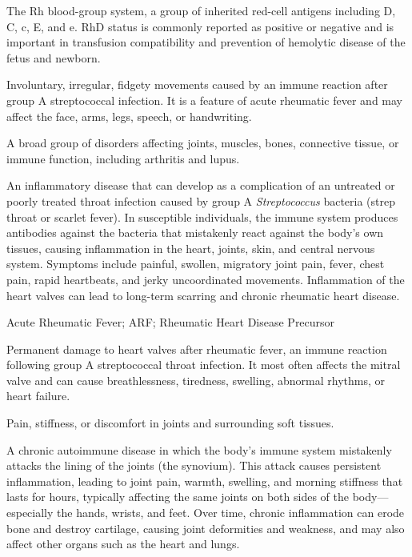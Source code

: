  The Rh blood-group system, a group of inherited red-cell antigens including D, C, c, E, and e. RhD status is commonly reported as positive or negative and is important in transfusion compatibility and prevention of hemolytic disease of the fetus and newborn.

 Involuntary, irregular, fidgety movements caused by an immune reaction after group A streptococcal infection. It is a feature of acute rheumatic fever and may affect the face, arms, legs, speech, or handwriting.

 A broad group of disorders affecting joints, muscles, bones, connective tissue, or immune function, including arthritis and lupus.

 An inflammatory disease that can develop as a complication of an untreated or poorly treated throat infection caused by group A \textit{Streptococcus} bacteria (strep throat or scarlet fever). In susceptible individuals, the immune system produces antibodies against the bacteria that mistakenly react against the body's own tissues, causing inflammation in the heart, joints, skin, and central nervous system. Symptoms include painful, swollen, migratory joint pain, fever, chest pain, rapid heartbeats, and jerky uncoordinated movements. Inflammation of the heart valves can lead to long-term scarring and chronic rheumatic heart disease.

\synonyms
Acute Rheumatic Fever; ARF; Rheumatic Heart Disease Precursor

 Permanent damage to heart valves after rheumatic fever, an immune reaction following group A streptococcal throat infection. It most often affects the mitral valve and can cause breathlessness, tiredness, swelling, abnormal rhythms, or heart failure.

 Pain, stiffness, or discomfort in joints and surrounding soft tissues.

 A chronic autoimmune disease in which the body's immune system mistakenly attacks the lining of the joints (the synovium). This attack causes persistent inflammation, leading to joint pain, warmth, swelling, and morning stiffness that lasts for hours, typically affecting the same joints on both sides of the body---especially the hands, wrists, and feet. Over time, chronic inflammation can erode bone and destroy cartilage, causing joint deformities and weakness, and may also affect other organs such as the heart and lungs.

